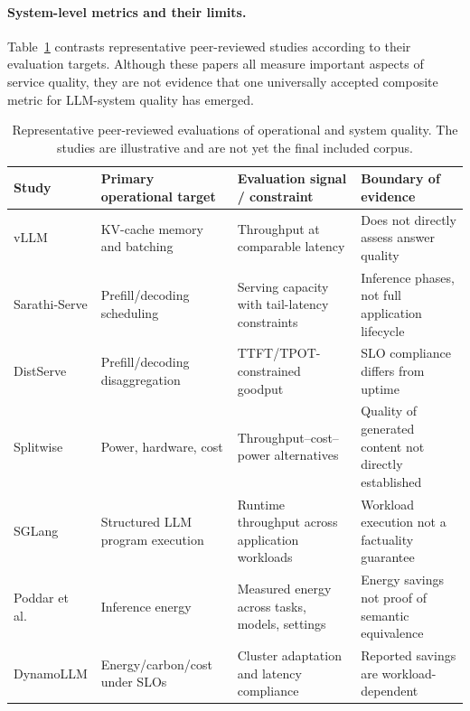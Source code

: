 \paragraph{System-level metrics and their limits.}
Table~\ref{tab:operational-quality-studies} contrasts representative peer-reviewed studies according to their evaluation targets. Although these papers all measure important aspects of service quality, they are not evidence that one universally accepted composite metric for LLM-system quality has emerged.

\begin{table}[t]
\centering
\footnotesize
\caption{Representative peer-reviewed evaluations of operational and system quality. The studies are illustrative and are not yet the final included corpus.}
\label{tab:operational-quality-studies}
\begin{tabular}{p{} p{} p{} p{}}
\toprule
\textbf{Study} & \textbf{Primary operational target} & \textbf{Evaluation signal / constraint} & \textbf{Boundary of evidence} \\
\midrule
vLLM \cite{kwon2023vllm} & KV-cache memory and batching & Throughput at comparable latency & Does not directly assess answer quality \\
Sarathi-Serve \cite{agrawal2024sarathi} & Prefill/decoding scheduling & Serving capacity with tail-latency constraints & Inference phases, not full application lifecycle \\
DistServe \cite{zhong2024distserve} & Prefill/decoding disaggregation & TTFT/TPOT-constrained goodput & SLO compliance differs from uptime \\
Splitwise \cite{patel2024splitwise} & Power, hardware, cost & Throughput--cost--power alternatives & Quality of generated content not directly established \\
SGLang \cite{zheng2024sglang} & Structured LLM program execution & Runtime throughput across application workloads & Workload execution not a factuality guarantee \\
Poddar et al.\ \cite{poddar2025energy} & Inference energy & Measured energy across tasks, models, settings & Energy savings not proof of semantic equivalence \\
DynamoLLM \cite{stojkovic2025dynamollm} & Energy/carbon/cost under SLOs & Cluster adaptation and latency compliance & Reported savings are workload-dependent \\
\bottomrule
\end{tabular}
\end{table}

